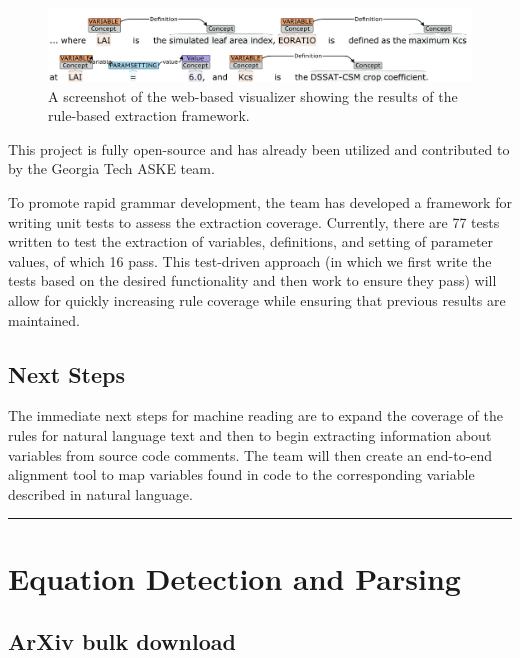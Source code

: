 \documentclass[article, 12pt, oneside]{memoir}
\begin{document}
\begin{figure}
\centering
\includegraphics{figs/extractions.png}
\caption{A screenshot of the web-based visualizer showing the results of
the rule-based extraction framework.}
\end{figure}

This project is fully open-source and has already been utilized and
contributed to by the Georgia Tech ASKE team.

To promote rapid grammar development, the team has developed a framework
for writing unit tests to assess the extraction coverage. Currently,
there are 77 tests written to test the extraction of variables,
definitions, and setting of parameter values, of which 16 pass. This
test-driven approach (in which we first write the tests based on the
desired functionality and then work to ensure they pass) will allow for
quickly increasing rule coverage while ensuring that previous results
are maintained.

\hypertarget{next-steps}{%
\subsection{Next Steps}\label{next-steps}}

The immediate next steps for machine reading are to expand the coverage
of the rules for natural language text and then to begin extracting
information about variables from source code comments. The team will
then create an end-to-end alignment tool to map variables found in code
to the corresponding variable described in natural language.

\begin{center}\rule{0.5\linewidth}{\linethickness}\end{center}

\hypertarget{equation-detection-and-parsing}{%
\section{Equation Detection and
Parsing}\label{equation-detection-and-parsing}}

\hypertarget{arxiv-bulk-download}{%
\subsection{ArXiv bulk download}\label{arxiv-bulk-download}}
\end{document}
